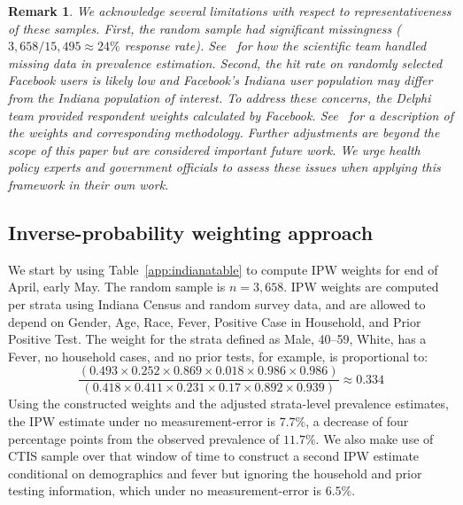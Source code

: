 \documentclass[11pt]{amsart}
\numberwithin{equation}{section}
\theoremstyle{plain}
\newtheorem{remark}{Remark}
\begin{document}

\begin{remark}
\label{rmk:limitations}
 We acknowledge several limitations with respect to representativeness of these samples.  First, the random sample had significant missingness ($3,658/15,495 \approx 24\%$ response rate). See~\cite{Yiannoutsos2021} for how the scientific team handled missing data in prevalence estimation. Second, the hit rate on randomly selected Facebook users is likely low and Facebook's Indiana user population may differ from the Indiana population of interest.  To address these concerns, the Delphi team provided respondent weights calculated by Facebook.  See~\cite{Barkay2020} for a description of the weights and corresponding methodology.  Further adjustments are beyond the scope of this paper but are considered important future work. We urge health policy experts and government officials to assess these issues when applying this framework in their own work.
 \end{remark}


 \subsection{Inverse-probability weighting approach}
 \label{section:ipwapproach}



 We start by using Table~\ref{app:indianatable} to compute IPW weights for end of April, early May.  The random sample is $n=3,658$. IPW weights are computed per strata using Indiana Census and random survey data, and are allowed to depend on Gender, Age, Race, Fever, Positive Case in Household, and Prior Positive Test. The weight for the strata defined as Male, 40--59, White, has a Fever, no household cases, and no prior tests, for example, is proportional to:
 $$
 \frac{\left( 0.493 \times 0.252 \times 0.869 \times 0.018 \times 0.986 \times 0.986 \right)}{\left(0.418 \times 0.411 \times 0.231 \times 0.17 \times 0.892 \times 0.939 \right)} \approx 0.334
 $$
 Using the constructed weights and the adjusted strata-level prevalence estimates, the IPW estimate under no measurement-error is $7.7\%$, a decrease of four percentage points from the observed prevalence of $11.7\%$. We also make use of CTIS sample over that window of time to construct a second IPW estimate conditional on demographics and fever but ignoring the household and prior testing information, which under no measurement-error is $6.5$\%.
\end{document}
